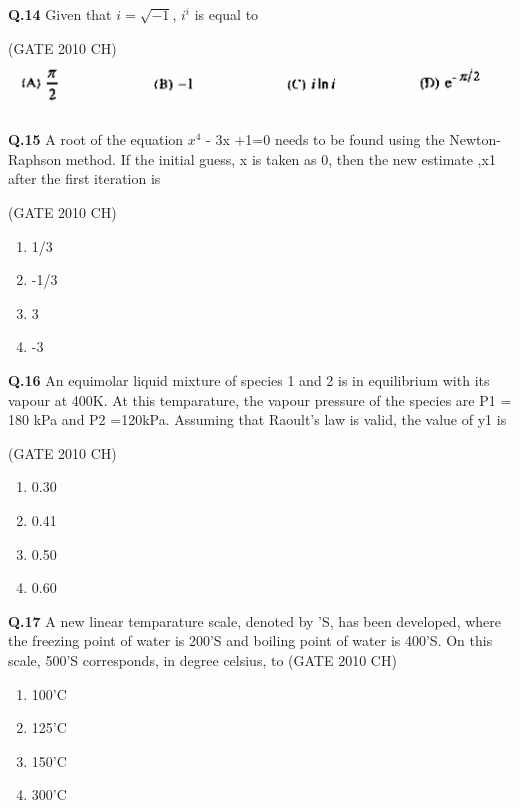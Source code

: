 \documentclass[journal,12pt,onecolumn]{exam}
\theoremstyle{remark}
\begin{document}
   \noindent
   \textbf{Q.14}
 Given that $i=\sqrt{-1}$, $i^i$ is equal  to
     
    \hfill{(GATE 2010 CH)}\\
  \includegraphics[width=1.0\linewidth]{images/Q.14 options.png}
       


    
 \noindent
\textbf{Q.15}
 A root of the equation $x^4$ - 3x +1=0 needs to be found using the Newton-Raphson method. If the initial guess, x is taken as 0, then the new estimate ,x1 after the first iteration is 
 
 \hfill{(GATE 2010 CH)}\\
 
\begin{enumerate}
    \item 1/3
    \item -1/3
    \item 3
    \item -3
 \end{enumerate}


 \noindent
 \textbf{Q.16}
   An equimolar liquid mixture of species 1 and 2 is in equilibrium with its vapour at 400K. At this temparature, the vapour pressure of the species are P1 = 180 kPa and P2 =120kPa. Assuming that Raoult's law is valid, the value of y1 is
 
 \hfill{(GATE 2010 CH)}\\

 \begin{enumerate}
     \item 0.30
     \item 0.41
     \item 0.50
     \item 0.60
 \end{enumerate}


\noindent
\textbf{Q.17}
 A new linear temparature scale, denoted by 'S, has been developed, where the freezing point of water is 200'S and boiling point of water is 400'S. On this scale, 500'S corresponds, in degree celsius, to
 \hfill{(GATE 2010 CH)}\\

 \begin{enumerate}
     \item 100'C
     \item 125'C
     \item 150'C
     \item 300'C

 \end{enumerate}
\end{document}
